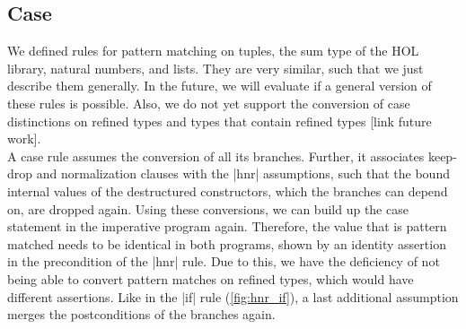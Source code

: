 \subsection{Case}

We defined rules for pattern matching on tuples, the sum type of the HOL library, natural numbers, and lists. They are very similar, such that we just describe them generally. In the future, we will evaluate if a general version of these rules is possible. Also, we do not yet support the conversion of case distinctions on refined types and types that contain refined types [link future work].\\
A case rule assumes the conversion of all its branches. Further, it associates keep-drop and normalization clauses with the |hnr| assumptions, such that the bound internal values of the destructured constructors, which the branches can depend on, are dropped again. Using these conversions, we can build up the case statement in the imperative program again. Therefore, the value that is pattern matched needs to be identical in both programs, shown by an identity assertion in the precondition of the |hnr| rule. Due to this, we have the deficiency of not being able to convert pattern matches on refined types, which would have different assertions.
Like in the |if| rule (\autoref{fig:hnr_if}), a last additional assumption merges the postconditions of the branches again.

